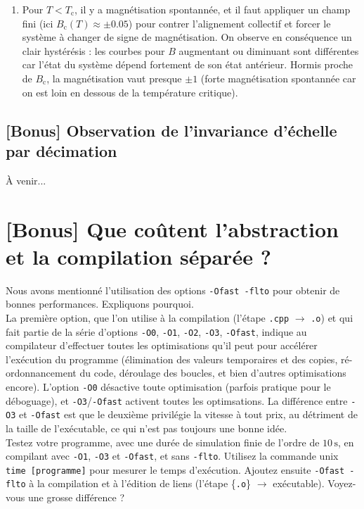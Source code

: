\documentclass{book}
\newcommand{\inline}[1]{\texttt{#1}}
\begin{document}
\begin{correction}
\begin{enumerate}
\item Pour $T<T_\text{c}$, il y a magnétisation spontannée, et il faut appliquer un champ fini (ici $B_\text{c}(T) \approx \pm 0.05$) pour contrer l'alignement collectif et forcer le système à changer de signe de magnétisation. On observe en conséquence un clair hystérésis : les courbes pour $B$ augmentant ou diminuant sont différentes car l'état du système dépend fortement de son état antérieur. Hormis proche de $B_\text{c}$, la magnétisation vaut presque $\pm 1$ (forte magnétisation spontannée car on est loin en dessous de la température critique).
\end{enumerate}
\end{correction}

\subsection{[Bonus] Observation de l'invariance d'échelle par décimation}

À venir...

\section{[Bonus] Que coûtent l'abstraction et la compilation séparée ?}

Nous avons mentionné l'utilisation des options \inline{-Ofast -flto} pour obtenir de bonnes performances. Expliquons pourquoi.\\

La première option, que l'on utilise à la compilation (l'étape \texttt{.cpp} $\to$ \texttt{.o}) et qui fait partie de la série d'options \inline{-O0}, \inline{-O1}, \inline{-O2}, \inline{-O3}, \inline{-Ofast}, indique au compilateur d'effectuer toutes les optimisations qu'il peut pour accélérer l'exécution du programme (élimination des valeurs temporaires et des copies, ré-ordonnancement du code, déroulage des boucles, et bien d'autres optimisations encore). L'option \inline{-O0} désactive toute optimisation (parfois pratique pour le déboguage), et \inline{-O3}/\inline{-Ofast} activent toutes les optimsations. La différence entre \inline{-O3} et \inline{-Ofast} est que le deuxième privilégie la vitesse à tout prix, au détriment de la taille de l'exécutable, ce qui n'est pas toujours une bonne idée.\\

Testez votre programme, avec une durée de simulation finie de l'ordre de $10\,\mathrm{s}$, en compilant avec \inline{-O1}, \inline{-O3} et \inline{-Ofast}, et sans \inline{-flto}. Utilisez la commande unix \texttt{time [programme]} pour mesurer le temps d'exécution. Ajoutez ensuite \inline{-Ofast -flto} à la compilation et à l'édition de liens (l'étape \{\texttt{.o}\} $\to$ exécutable). Voyez-vous une grosse différence ?\\
\end{document}
